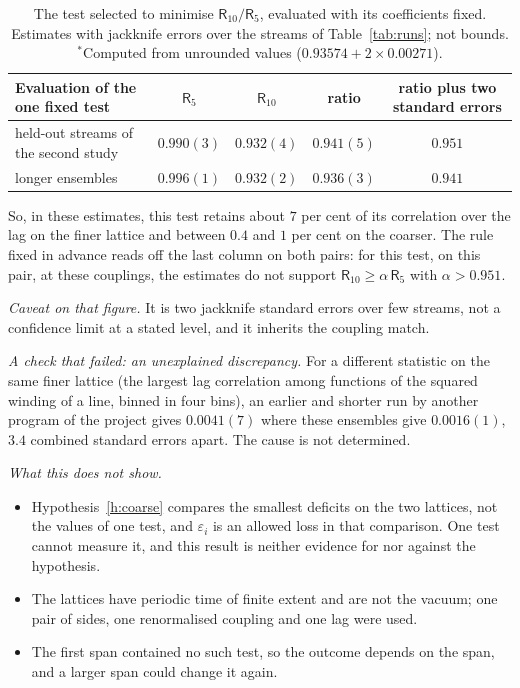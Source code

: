 \begin{table}[ht]
\centering\small
\begin{tabular}{@{}lcccc@{}}
\toprule
Evaluation of the one fixed test & $\mathsf R_5$ & $\mathsf R_{10}$ & ratio & ratio plus two standard errors \\
\midrule
held-out streams of the second study & $0.990(3)$ & $0.932(4)$ & $0.941(5)$ & $0.951$ \\
longer ensembles & $0.996(1)$ & $0.932(2)$ & $0.936(3)$ & $0.941$\rlap{$^{*}$} \\
\bottomrule
\end{tabular}
\caption{The test selected to minimise $\mathsf R_{10}/\mathsf R_5$, evaluated with its coefficients fixed.
Estimates with jackknife errors over the streams of Table~\ref{tab:runs}; not bounds. $^{*}$Computed from
unrounded values ($0.93574+2\times0.00271$).}\label{tab:cross}
\end{table}

So, in these estimates, this test retains about $7$ per cent of its correlation over the lag on the finer lattice and between
$0.4$ and $1$ per cent on the coarser. The rule fixed in advance reads off the last column on both pairs: for
this test, on this pair, at these couplings, the estimates do not support
$\mathsf R_{10}\ge\alpha\,\mathsf R_5$ with $\alpha>0.951$.

\emph{Caveat on that figure.} It is two jackknife standard errors over few streams, not a confidence limit at
a stated level, and it inherits the coupling match.

\emph{A check that failed: an unexplained discrepancy.} For a different statistic on the same finer lattice (the largest lag correlation among functions of the
squared winding of a line, binned in four bins),
an earlier and shorter run by another program of the project gives $0.0041(7)$ where these ensembles give
$0.0016(1)$, $3.4$ combined standard errors apart. The cause is not determined.

\emph{What this does not show.}
\begin{itemize}
\item Hypothesis~\ref{h:coarse} compares the smallest deficits on the two lattices, not the values of one
test, and $\varepsilon_i$ is an allowed loss in that comparison. One test cannot measure it, and this result
is neither evidence for nor against the hypothesis.
\item The lattices have periodic time of finite extent and are not the vacuum; one pair of sides, one
renormalised coupling and one lag were used.
\item The first span contained no such test, so the outcome depends on the span, and a larger span could
change it again.
\end{itemize}

